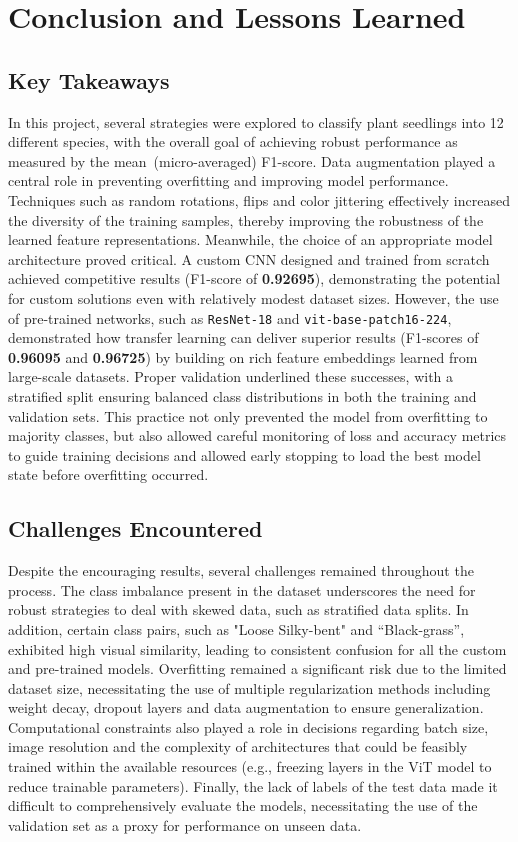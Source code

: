 \section{Conclusion and Lessons Learned}

\subsection{Key Takeaways}

In this project, several strategies were explored to classify plant seedlings into 12 different species, with the overall goal of achieving robust performance as measured by the mean~(micro-averaged) F1-score. Data augmentation played a central role in preventing overfitting and improving model performance. Techniques such as random rotations, flips and color jittering effectively increased the diversity of the training samples, thereby improving the robustness of the learned feature representations. Meanwhile, the choice of an appropriate model architecture proved critical. A custom CNN designed and trained from scratch achieved competitive results (F1-score of \textbf{0.92695}), demonstrating the potential for custom solutions even with relatively modest dataset sizes. However, the use of pre-trained networks, such as \texttt{ResNet-18} and \texttt{vit-base-patch16-224}, demonstrated how transfer learning can deliver superior results (F1-scores of \textbf{0.96095} and \textbf{0.96725}) by building on rich feature embeddings learned from large-scale datasets. Proper validation underlined these successes, with a stratified split ensuring balanced class distributions in both the training and validation sets. This practice not only prevented the model from overfitting to majority classes, but also allowed careful monitoring of loss and accuracy metrics to guide training decisions and allowed early stopping to load the best model state before overfitting occurred.

\subsection{Challenges Encountered}

Despite the encouraging results, several challenges remained throughout the process. The class imbalance present in the dataset underscores the need for robust strategies to deal with skewed data, such as stratified data splits. In addition, certain class pairs, such as "Loose Silky-bent" and ``Black-grass'', exhibited high visual similarity, leading to consistent confusion for all the custom and pre-trained models. Overfitting remained a significant risk due to the limited dataset size, necessitating the use of multiple regularization methods including weight decay, dropout layers and data augmentation to ensure generalization. Computational constraints also played a role in decisions regarding batch size, image resolution and the complexity of architectures that could be feasibly trained within the available resources (e.g., freezing layers in the ViT model to reduce trainable parameters). Finally, the lack of labels of the test data made it difficult to comprehensively evaluate the models, necessitating the use of the validation set as a proxy for performance on unseen data.


